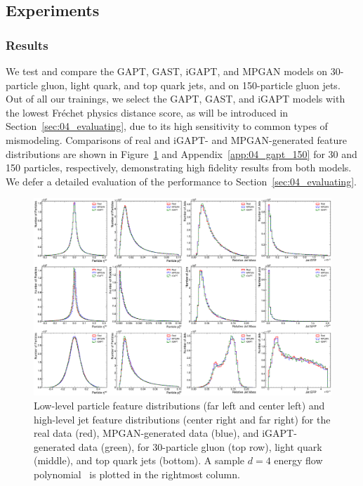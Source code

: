 \subsection{Experiments}

\subsubsection{Results}

We test and compare the GAPT, GAST, iGAPT, and MPGAN models on 30-particle gluon, light quark, and top quark jets, and on 150-particle gluon jets.
Out of all our trainings, we select the GAPT, GAST, and iGAPT models with the lowest Fr\'{e}chet physics distance score, as will be introduced in Section~\ref{sec:04_evaluating}, due to its high sensitivity to common types of mismodeling.
Comparisons of real and iGAPT- and MPGAN-generated feature distributions are shown in Figure~\ref{fig:04_igapt_feature_distributions_30} and Appendix~\ref{app:04_gapt_150} for 30 and 150 particles, respectively, demonstrating high fidelity results from both models.
We defer a detailed evaluation of the performance to Section~\ref{sec:04_evaluating}.

\begin{figure}[htbp!]
    \centering
    \includegraphics[width=\textwidth]{figures/04-ML4Sim/igapt/feature_distributions_30.pdf}
    \caption[Low-level particle feature distributions (far left and center left) and high-level jet feature distributions (center right and far right).]{Low-level particle feature distributions (far left and center left) and high-level jet feature distributions (center right and far right) for the real data (red), MPGAN-generated data (blue), and iGAPT-generated data (green), for 30-particle gluon (top row), light quark (middle), and top quark jets (bottom).
    A sample $d = 4$ energy flow polynomial~\cite{Komiske:2017aww} is plotted in the rightmost column.
    }
    \label{fig:04_igapt_feature_distributions_30}
\end{figure}

